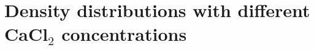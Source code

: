 \documentclass[pre,aps,floatfix,authordate1-4,twocolumn]{revtex4-1}
\begin{document}


\section{Density distributions with different CaCl$_2$ concentrations}
\end{document}
